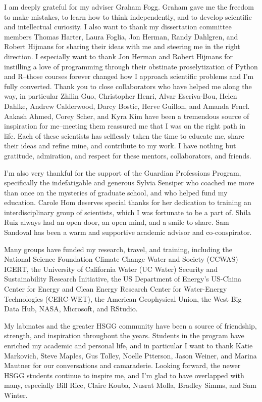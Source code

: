 \begin{frontmatter}
\begin{acknowledgments}
I am deeply grateful for my adviser Graham Fogg. Graham gave me the freedom to make mistakes, to learn how to think independently, and to develop scientific and intellectual curiosity. I also want to thank my dissertation committee members Thomas Harter, Laura Foglia, Jon Herman, Randy Dahlgren, and Robert Hijmans for sharing their ideas with me and steering me in the right direction. I especially want to thank Jon Herman and Robert Hijmans for instilling a love of programming through their obstinate proselytization of Python and R--those courses forever changed how I approach scientific problems and I'm fully converted. Thank you to close collaborators who have helped me along the way, in particular Zhilin Guo, Christopher Henri, Alvar Escriva-Bou, Helen Dahlke, Andrew Calderwood, Darcy Bostic, Herve Guillon, and Amanda Fencl. Aakash Ahmed, Corey Scher, and Kyra Kim have been a tremendous source of inspiration for me--meeting them reassured me that I was on the right path in life. Each of these scientists has selflessly taken the time to educate me, share their ideas and refine mine, and contribute to my work. I have nothing but gratitude, admiration, and respect for these mentors, collaborators, and friends.

I'm also very thankful for the support of the Guardian Professions Program, specifically the indefatigable and generous Sylvia Sensiper who coached me more than once on the mysteries of graduate school, and who helped fund my education. Carole Hom deserves special thanks for her dedication to training an interdisciplinary group of scientists, which I was fortunate to be a part of. Shila Ruiz always had an open door, an open mind, and a smile to share. Sam Sandoval has been a warm and supportive academic advisor and co-conspirator. 

Many groups have funded my research, travel, and training, including the National Science Foundation Climate Change Water and Society (CCWAS) IGERT, the University of California Water (UC Water) Security and Sustainability Research Initiative, the US Department of Energy's US-China Center for Energy and Clean Energy Research Center for Water-Energy Technologies (CERC-WET), the American Geophysical Union, the West Big Data Hub, NASA, Microsoft, and RStudio. 

My labmates and the greater HSGG community have been a source of friendship, strength, and inspiration throughout the years. Students in the program have enriched my academic and personal life, and in particular I want to thank Katie Markovich, Steve Maples, Gus Tolley, Noelle Ptterson, Jason Weiner, and Marina Mautner for our conversations and camaraderie. Looking forward, the newer HSGG students continue to inspire me, and I'm glad to have overlapped with many, especially Bill Rice, Claire Kouba, Nusrat Molla, Bradley Simms, and Sam Winter.


\end{acknowledgments}
\end{frontmatter}
